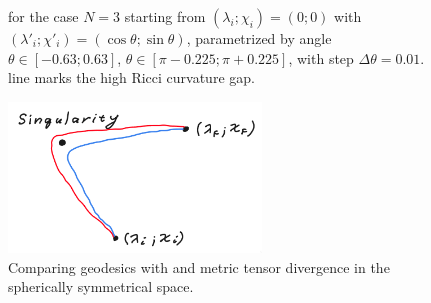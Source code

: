 \begin{figure}[H]
    \centering
    \caption{ for the case $N=3$ starting from $(\lambda_i;\chi_i)=(0;0)$ with $(\lambda'_i;\chi'_i)=(\cos\theta;\sin\theta)$, parametrized by angle $\theta\in [-0.63;0.63]$, $\theta\in [\pi-0.225;\pi+0.225]$, with step $\Delta\theta=0.01$.  line marks the high Ricci curvature gap.}
    \label{fig:N=3_geodesics}    
\end{figure}



\begin{figure}[H]
    \centering
    \includegraphics[width=0.6\textwidth]{../img/geodesicsinGR.png}
    \caption{Comparing geodesics with  and  metric tensor divergence in the spherically symmetrical space. }
    \label{fig:geodesicsinGR}
\end{figure}

